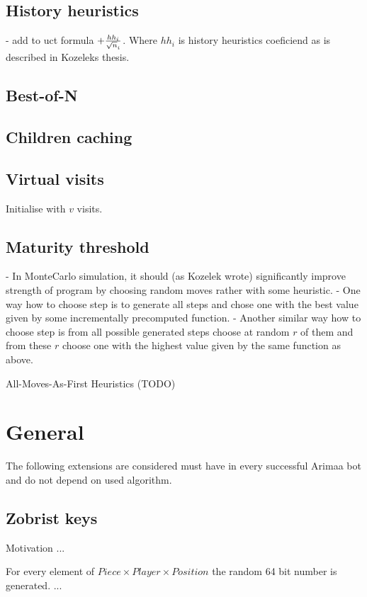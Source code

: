 \subsection{History heuristics}
- add to uct formula $+ {hh_i \over \sqrt n_i}$. Where $hh_i$ is history
heuristics coeficiend as is described in Kozeleks thesis\cite{KOZELEK}.

\subsection{Best-of-N}
\subsection{Children caching}
\subsection{Virtual visits}
Initialise with $v$ visits.
\subsection{Maturity threshold}

- In MonteCarlo simulation, it should (as Kozelek wrote) significantly improve
  strength of program by choosing random moves rather with some heuristic.
	- One way how to choose step is to generate all steps and chose one with
	  the best value given by some incrementally precomputed function.
	- Another similar way how to choose step is from all possible generated
	  steps choose at random $r$ of them and from these $r$ choose one with the
	  highest value given by the same function as above.

All-Moves-As-First Heuristics (TODO)

\section{General}
The following extensions are considered must have in every successful Arimaa
bot and do not depend on used algorithm.

	\subsection{Zobrist keys}
	Motivation ...

	For every element of $Piece\times Player\times Position$ the random 64 bit
	number is generated. ...

